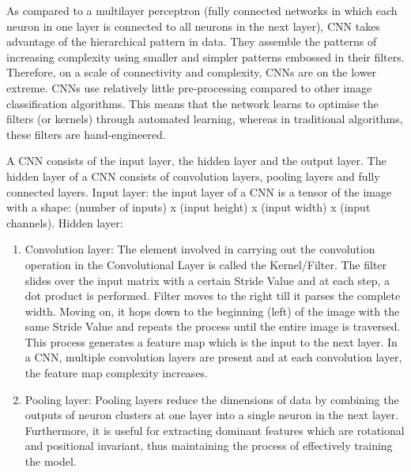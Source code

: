     As compared to a multilayer perceptron (fully connected networks in which each neuron in one layer is connected to all neurons in the next layer), CNN takes advantage of the hierarchical pattern in data. They assemble the patterns of increasing complexity using smaller and simpler patterns embossed in their filters. Therefore, on a scale of connectivity and complexity, CNNs are on the lower extreme. CNNs use relatively little pre-processing compared to other image classification algorithms. This means that the network learns to optimise the filters (or kernels) through automated learning, whereas in traditional algorithms, these filters are hand-engineered.
    
    A CNN consists of the input layer, the hidden layer and the output layer. The hidden layer of a CNN consists of convolution layers, pooling layers and fully connected layers. 
    Input layer: the input layer of a CNN is a tensor of the image with a shape: (number of inputs) x (input height) x (input width) x (input channels).
    Hidden layer: 
    \begin{enumerate}
    	\item Convolution layer: The element involved in carrying out the convolution operation in the Convolutional Layer is called the Kernel/Filter. The filter slides over the input matrix with a certain Stride Value and at each step, a dot product is performed. Filter moves to the right till it parses the complete width. Moving on, it hops down to the beginning (left) of the image with the same Stride Value and repeats the process until the entire image is traversed. This process generates a feature map which is the input to the next layer. In a CNN, multiple convolution layers are present and at each convolution layer, the feature map complexity increases. 
    	\item Pooling layer: Pooling layers reduce the dimensions of data by combining the outputs of neuron clusters at one layer into a single neuron in the next layer. Furthermore, it is useful for extracting dominant features which are rotational and positional invariant, thus maintaining the process of effectively training the model. 
    \end{enumerate}
       
